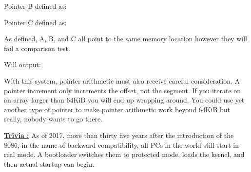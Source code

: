 \documentclass[book.tex]{subfiles}
\begin{document}
\bigskip

Pointer B defined as:\\
\par
\begin{minipage}{\textwidth}

\end{minipage}

\bigskip

Pointer C defined as:\\
\par
\begin{minipage}{\textwidth}

\end{minipage}

As defined, A, B, and C all point to the same memory location however they will fail a comparison test.\\

\begin{minipage}{\textwidth}

\end{minipage}
\par
Will output:\\

\begin{minipage}{\textwidth}

\end{minipage}
\par

With this system, pointer arithmetic must also receive careful consideration. A  pointer increment only increments the offset, not the segment. If you iterate on an array larger than 64KiB you will end up wrapping around. You could use yet another type of pointer  to make pointer arithmetic work beyond 64KiB but really, nobody wants to go there.


\par

\textbf{\underline{Trivia :}}  As of 2017, more than thirty five years after the introduction of the 8086, in the name of backward compatibility, all PCs in the world still start in real mode. A bootloader switches them to protected mode, loads the kernel, and then actual startup can begin.
\end{document}
